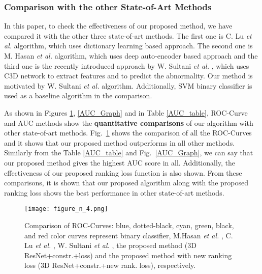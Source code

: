 \documentclass[conference]{IEEEtran}
\begin{document}
\subsubsection{Comparison with the other State-of-Art Methods}

In this paper, to check the effectiveness of our proposed method, we have compared it with the other three state-of-art methods. The first one is C. Lu \textit{et al.} \cite{A9} algorithm, which uses dictionary learning based approach. The second one is M. Hasan \textit{et al.} \cite{A11} algorithm, which uses deep auto-encoder based approach and the third one is the recently introduced approach by W. Sultani \textit{et al.} \cite{A6}, which uses C3D \cite{A1} network to extract features and to predict the abnormality. Our method is motivated by W. Sultani \textit{et al.} \cite{A6} algorithm. Additionally, SVM binary classifier is used as a baseline algorithm in the comparison.

As shown in Figures \ref{ROC_Curve}, \ref{AUC_Graph} and in Table \ref{AUC_table}, ROC-Curve and AUC methods show the \textbf{quantitative comparisons} of our algorithm with other state-of-art methods. Fig.~\ref{ROC_Curve} shows the comparison of all the ROC-Curves and it shows that our proposed method outperforms in all other methods. Similarly from the Table \ref{AUC_table} and Fig.~\ref{AUC_Graph}, we can say that our proposed method gives the highest AUC score in all. Additionally, the effectiveness of our proposed ranking loss function is also shown. From these comparisons, it is shown that our proposed algorithm along with the proposed ranking loss shows the best performance in other state-of-art methods.
\begin{figure}
	\begin{center}
    \texttt{[image: figure\_n\_4.png]}
	\end{center}
	\caption{Comparison of ROC-Curves: blue, dotted-black, cyan, green, black, and red color curves represent binary classifier, M.Hasan \textit{et al.} \cite{A11}, C. Lu \textit{et al.} \cite{A9}, W. Sultani \textit{et al.} \cite{A6}, the proposed method (3D ResNet+constr.+loss) and the proposed method with new ranking loss (3D ResNet+constr.+new rank. loss), respectively.}
	\label{ROC_Curve}
\end{figure}
\end{document}
